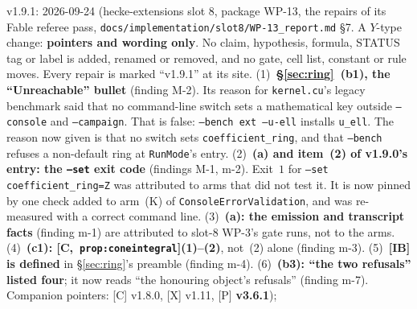 \documentclass[11pt]{article}
\theoremstyle{remark}
\newcommand{\HA}[1]{[C,~\texttt{#1}]}      %
\begin{document}
v1.9.1: 2026-09-24 (hecke-extensions slot 8, package WP-13, the repairs of its
Fable referee pass, \texttt{docs/implementation/slot8/WP-13\_report.md} \S7. A $Y$-type change:
\textbf{pointers and wording only}. No claim, hypothesis, formula, STATUS tag or label is added,
renamed or removed, and no gate, cell list, constant or rule moves. Every repair is marked
``v1.9.1'' at its site.
(1)~\textbf{\S\ref{sec:ring}~(b1), the ``Unreachable'' bullet} (finding M-2). Its reason for
\texttt{kernel.cu}'s legacy benchmark said that no command-line switch sets a mathematical key
outside \texttt{--console} and \texttt{--campaign}. That is false: \texttt{--bench ext --u-ell}
installs \texttt{u\_ell}. The reason now given is that no switch sets \texttt{coefficient\_ring},
and that \texttt{--bench} refuses a non-default ring at \texttt{RunMode}'s entry.
(2)~\textbf{(a) and item~(2) of v1.9.0's entry: the \texttt{--set} exit code} (findings M-1,
m-2). Exit~$1$ for \texttt{--set coefficient\_ring=Z} was attributed to arms that did not test
it. It is now pinned by one check added to arm~(K) of \texttt{ConsoleErrorValidation}, and was
re-measured with a correct command line.
(3)~\textbf{(a): the emission and transcript facts} (finding m-1) are attributed to slot-8 WP-3's
gate runs, not to the arms.
(4)~\textbf{(c1): \HA{prop:coneintegral}(1)--(2)}, not~(2) alone (finding m-3).
(5)~\textbf{[IB] is defined} in \S\ref{sec:ring}'s preamble (finding m-4).
(6)~\textbf{(b3): ``the two refusals'' listed four}; it now reads ``the honouring object's
refusals'' (finding m-7).
Companion pointers: [C] v1.8.0, [X] v1.11, [P] \textbf{v3.6.1});
\end{document}
